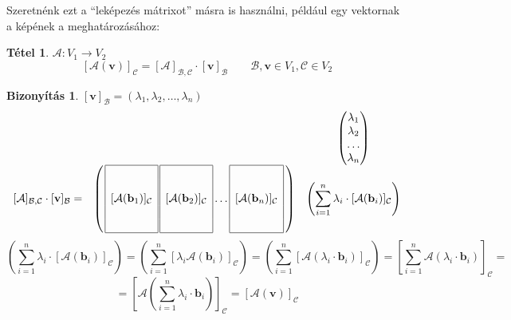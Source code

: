 \documentclass[a4paper,12pt,twoside]{book}
\newcommand{\vek}[1]{\mathbf{#1}} %
\newcommand{\ve}[2]{\mathbf{#1}_{#2}} %
\newcommand{\lista}[2]{{#1}_{1}, {#1}_{2}, \ldots, {#1}_{#2}}
\newtheorem{tetel}{Tétel}[chapter]
\newtheorem{biz}{Bizonyítás}[chapter]
\theoremstyle{break}
\begin{document}
Szeretnénk ezt a ``leképezés mátrixot'' másra is használni, például egy vektornak a képének a meghatározásához:
\begin{tetel} $\mathcal{A}: V_1 \to V_2$
 \[[\mathcal{A}(\vek{v})]_\mathcal{C} = [\mathcal{A}]_{\mathcal{B},\mathcal{C}}\cdot[\vek{v}]_\mathcal{B} \qquad \mathcal{B}, \vek{v} \in V_1, \mathcal{C} \in V_2\]
\end{tetel}
\begin{biz} $[\vek{v}]_\mathcal{B}=(\lista{\lambda}{n})$
\[\begin{matrix}
   & & \begin{pmatrix}\lambda_1\\\lambda_2\\\ldots\\\lambda_n\end{pmatrix}\\
   [\mathcal{A}]_{\mathcal{B},\mathcal{C}}\cdot[\vek{v}]_\mathcal{B} =  &
   \left(\,
      \begin{array}{|c|}\hline
	\\ \\ [\mathcal{A}( \ve{b}{1})]_\mathcal{C} \\ \\ \\\hline
      \end{array}
      \,
      \begin{array}{|c|}\hline
	\\ \\ [\mathcal{A}( \ve{b}{2})]_\mathcal{C} \\ \\ \\\hline
      \end{array} \ldots
      \begin{array}{|c|}\hline
	\\ \\ [\mathcal{A}( \ve{b}{n})]_\mathcal{C} \\ \\ \\\hline
      \end{array}
      \,
   \right) & \left(\displaystyle \sum^{n}_{i=1} \lambda_i\cdot[\mathcal{A}( \ve{b}{i})]_\mathcal{C} \right)
  \end{matrix}
\]
\[\left(\displaystyle \sum^{n}_{i=1} \lambda_i\cdot[\mathcal{A}( \ve{b}{i})]_\mathcal{C}\right) = \left(\displaystyle \sum^{n}_{i=1} [\lambda_i\mathcal{A}( \ve{b}{i})]_\mathcal{C}\right) = \left(\displaystyle \sum^{n}_{i=1} [\mathcal{A}(\lambda_i\cdot\ve{b}{i})]_\mathcal{C}\right) = \left[ \displaystyle \sum^{n}_{i=1} \mathcal{A}(\lambda_i\cdot\ve{b}{i}) \right]_\mathcal{C} = \]
\[ = \left[ \mathcal{A}\left( \displaystyle \sum^{n}_{i=1} \lambda_i\cdot\ve{b}{i}\right) \right]_\mathcal{C} = \left[ \mathcal{A}(\vek{v}) \right]_\mathcal{C} \] 
\end{biz}
\end{document}
